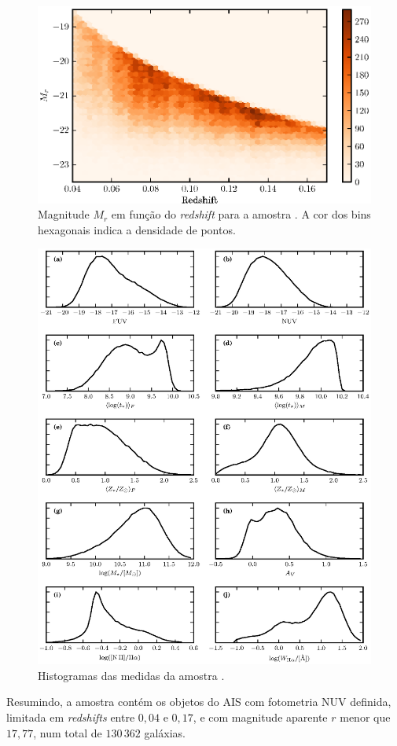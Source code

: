 \begin{figure}
	\includegraphics{figuras/completeness-volume.eps}
	\caption[Magnitude $M_r$ em função do {\em redshift}.]
	{Magnitude $M_r$ em função do {\em redshift} para a amostra \starlightUV. A
	cor dos bins hexagonais indica a densidade de pontos.}
	\label{fig:CompletezaRedshiftMag}
\end{figure}

\begin{figure}
	\includegraphics{figuras/histogram-sample.eps}
	\caption[Histogramas das medidas da amostra \starlightUV.]
	{Histogramas das medidas da amostra \starlightUV.}
	\label{fig:HistogramasAmostra}
\end{figure}

Resumindo, a amostra \starlightUV contém os objetos do AIS com fotometria NUV
definida, limitada em {\em redshifts} entre $0,04$ e $0,17$, e com magnitude
aparente $r$ menor que $17,77$, num total de $130\,362$ galáxias.


